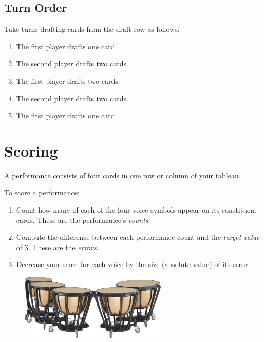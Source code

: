 \documentclass[a6paper, 12pt, parskip=half, DIV=14]{scrartcl}
\begin{document}
\subsection*{Turn Order}
Take turns drafting cards from the draft row as follows:
\begin{enumerate}[leftmargin=4ex]
\item The first player drafts one card.
\item The second player drafts two cards.
\item The first player drafts two cards.
\item The second player drafts two cards.
\item The first player drafts one card.
\end{enumerate}


\newpage
\enlargethispage{1.75\baselineskip}
\section*{Scoring}
A performance consists of four cards in one row or column of your tableau.

To score a performance:
\begin{enumerate}[leftmargin=4ex]
\item Count how many of each of the four voice symbols appear on its constituent cards. These are the performance's \emph{counts}.

\item Compute the difference between each performance count and the \emph{target value} of 3. These are the \emph{errors}.

\item Decrease your score for each voice by the size (absolute value) of its error.
\end{enumerate}

\vspace{0.5cm}

\begin{figure}[h]
\centering
\includegraphics[width=7cm]{Images/yamaha_timpani.jpg}
\end{figure}

\newpage
\enlargethispage{1.75\baselineskip}
\end{document}
